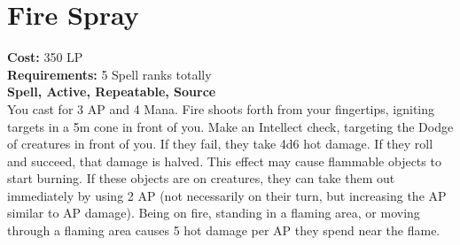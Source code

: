 \section{Fire Spray}\label{spell:fireSpray}
\textbf{Cost:} 350 LP\\
\textbf{Requirements:} 5 Spell ranks totally\\
\textbf{Spell, Active, Repeatable, Source}\\
You cast for 3 AP and 4 Mana.
Fire shoots forth from your fingertips, igniting targets in a 5m cone in front of you.
Make an Intellect check, targeting the Dodge of creatures in front of you.
If they fail, they take 4d6 hot damage.
If they roll and succeed, that damage is halved.
This effect may cause flammable objects to start burning.
If these objects are on creatures, they can take them out immediately by using 2 AP (not necessarily on their turn, but increasing the AP similar to AP damage).
Being on fire, standing in a flaming area, or moving through a flaming area causes 5 hot damage per AP they spend near the flame.